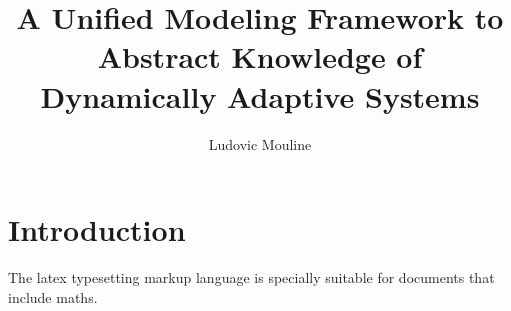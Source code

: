 \documentclass[review]{thesis}
\title{A Unified Modeling Framework to Abstract Knowledge of Dynamically Adaptive Systems}
\author{Ludovic Mouline}
\begin{document}
	\maketitle
	
	\frontmatter
		
	
	\chapter{Introduction}
	
	The \gls{latex} typesetting markup language is specially suitable 
for documents that include \gls{maths}.

	\clearpage
 	\printglossaries	
	
\end{document}
